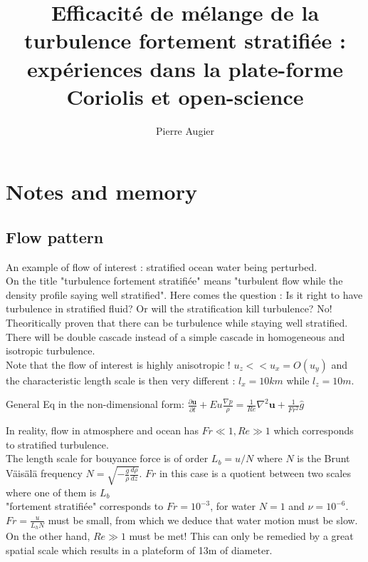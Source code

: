 \documentclass[a4paper,10pt,francais]{article}
\title{Efficacité de mélange de la turbulence fortement stratifiée : expériences dans la plate-forme Coriolis et open-science}
\author[1]{Pierre Augier}
\affil[1]{LEGI, Grenoble}
\begin{document}
\parindent=0cm
\parskip=3mm

\maketitle

\section{Notes and memory}


\subsection{Flow pattern}

 
An example of flow of interest : stratified ocean water being perturbed. \\

On the title "turbulence fortement stratifiée" means "turbulent flow while the density profile saying well stratified". Here comes the question : Is it right to have turbulence in stratified fluid? Or will the stratification kill turbulence? No! Theoritically proven that there can be turbulence while staying well stratified. There will be double cascade instead of a simple cascade in homogeneous and isotropic turbulence. \\

Note that the flow of interest is highly anisotropic ! $u_z << u_x = O(u_y)$ and the characteristic length scale is then very different : $l_x = 10 km$ while $l_z = 10m$.

General Eq in the non-dimensional form:
$ \frac{\partial \bm{u}}{\partial t} + Eu \frac{\nabla p}{\rho} = \frac{1}{Re}\nabla^{2}\bm{u}+\frac{1}{Fr^2}\hat{g}$

In reality, flow in atmosphere and ocean has $Fr \ll 1, Re \gg 1$ which corresponds to stratified turbulence. \\

The length scale for bouyance force is of order $ L_b = u/N$ where $N$ is the Brunt Väisälä frequency $N = \sqrt{-\frac{g}{\rho}\frac{d\rho}{dz}}$. $Fr$ in this case is a quotient between two scales where one of them is $L_b$ \\

"fortement stratifiée" corresponds to $Fr=10^{-3}$, for water $N=1$ and $\nu=10^{-6}$. $Fr=\frac{u}{L_h N}$ must be small, from which we deduce that water motion must be slow.
On the other hand, $Re\gg1$ must be met! This can only be remedied by a great spatial scale which results in a plateform of 13m of diameter.
\end{document}
